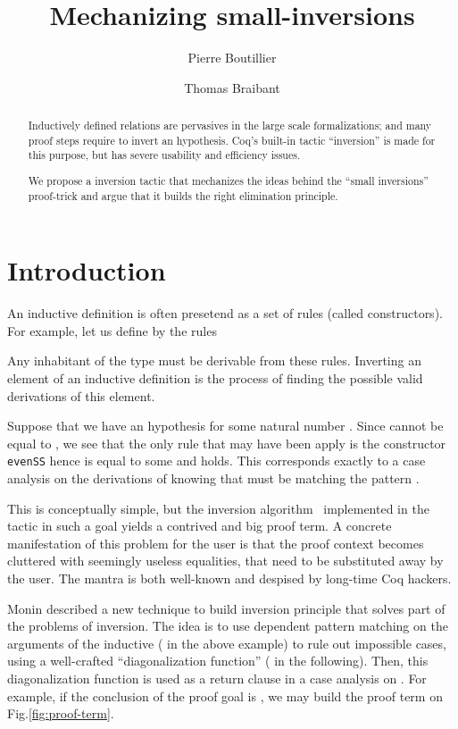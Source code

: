 \documentclass{llncs}
\title{Mechanizing small-inversions}
\author{Pierre Boutillier \and Thomas Braibant}
\institute{Inria Paris Rocquencourt}
\begin{document}
\maketitle
\begin{abstract}
  Inductively defined relations are pervasives in the large scale
  formalizations; and many proof steps require to invert an
  hypothesis. Coq's built-in tactic ``inversion'' is made for this
  purpose, but has severe usability and efficiency issues. 
  
  We propose a inversion tactic that mechanizes the ideas behind
  the ``small inversions'' proof-trick \cite{monin} and argue that it
  builds the right elimination principle.  
\end{abstract}
\section*{Introduction}

An inductive definition is often presetend as a set of rules (called
constructors). For example, let us define  by the rules
\newcommand\even{\mathtt{even}}
Any inhabitant of the type  must be derivable from these
rules. Inverting an element of an inductive definition is the process
of finding the possible valid derivations of this element. 

Suppose that we have an hypothesis  for some natural
number . Since  cannot be equal to , we see
that the only rule that may have been apply is the constructor
\texttt{evenSS} hence  is equal to some  and
 holds. This corresponds exactly to a case analysis on
the derivations of  knowing that  must be
matching the pattern . 

This is conceptually simple, but the inversion algorithm~\cite{cornes}
implemented in the  tactic in such a goal yields a
contrived and big proof term. A concrete manifestation of this problem
for the user is that the proof context becomes cluttered with
seemingly useless equalities, that need to be substituted away by the
user. The mantra  is both well-known
and despised by long-time Coq hackers.
 
Monin \cite{monin} described a new technique to build inversion
principle that solves part of the problems of inversion. The idea is
to use dependent pattern matching on the arguments of the inductive
( in the above example) to rule out impossible cases, using
a well-crafted ``diagonalization function'' ( in the
following). Then, this diagonalization function is used as a return
clause in a case analysis on . For example, if the
conclusion of the proof goal is , we may build the
proof term on Fig.\ref{fig:proof-term}. 
\end{document}
